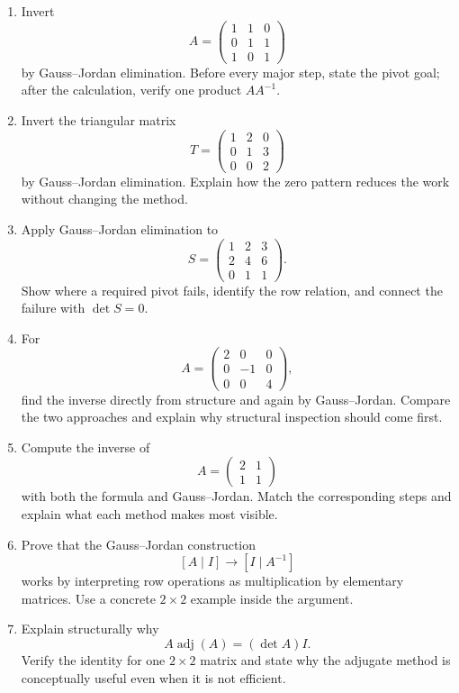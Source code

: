 \begin{enumerate}
\item Invert
\[
A=\begin{pmatrix}
1&1&0\\
0&1&1\\
1&0&1
\end{pmatrix}
\]
by Gauss--Jordan elimination. Before every major step, state the pivot goal; after the calculation, verify one product $AA^{-1}$.

\item Invert the triangular matrix
\[
T=\begin{pmatrix}
1&2&0\\
0&1&3\\
0&0&2
\end{pmatrix}
\]
by Gauss--Jordan elimination. Explain how the zero pattern reduces the work without changing the method.

\item Apply Gauss--Jordan elimination to
\[
S=\begin{pmatrix}
1&2&3\\
2&4&6\\
0&1&1
\end{pmatrix}.
\]
Show where a required pivot fails, identify the row relation, and connect the failure with $\det S=0$.

\item For
\[
A=\begin{pmatrix}
2&0&0\\
0&-1&0\\
0&0&4
\end{pmatrix},
\]
find the inverse directly from structure and again by Gauss--Jordan. Compare the two approaches and explain why structural inspection should come first.

\item Compute the inverse of
\[
A=\begin{pmatrix}2&1\\1&1\end{pmatrix}
\]
with both the formula and Gauss--Jordan. Match the corresponding steps and explain what each method makes most visible.

\item Prove that the Gauss--Jordan construction
\[
[A\mid I]\longrightarrow[I\mid A^{-1}]
\]
works by interpreting row operations as multiplication by elementary matrices. Use a concrete $2\times2$ example inside the argument.

\item Explain structurally why
\[
A\operatorname{adj}(A)=(\det A)I.
\]
Verify the identity for one $2\times2$ matrix and state why the adjugate method is conceptually useful even when it is not efficient.


\end{enumerate}
